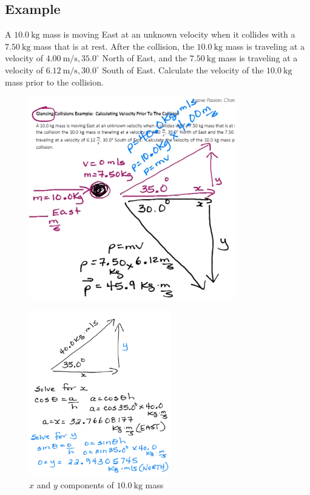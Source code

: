 \documentclass[a4paper,12pt]{article}
\begin{document}
\subsection{Example}
A $\SI{10.0}{\kg}$ mass is moving East at an unknown velocity when it collides with a $\SI{7.50}{\kg}$ mass that is at rest. After the collision, the $\SI{10.0}{\kg}$ mass is traveling at a velocity of $\SI{4.00}{\m/\s}, 35.0^\circ$ North of East, and the $\SI{7.50}{\kg}$ mass is traveling at a velocity of $\SI{6.12}{\m/\s}, 30.0^\circ$ South of East. Calculate the velocity of the $\SI{10.0}{\kg}$ mass prior to the collision.

\begin{figure}[H]
    \centering
    \includegraphics[width=0.8\textwidth]{q-glance-1a}
\end{figure}
\begin{figure}[H]
    \centering
    \caption{$x$ and $y$ components of $\SI{10.0}{\kg}$ mass}
    \includegraphics[width=0.55\textwidth]{q-glance-1b}
\end{figure}
\end{document}
